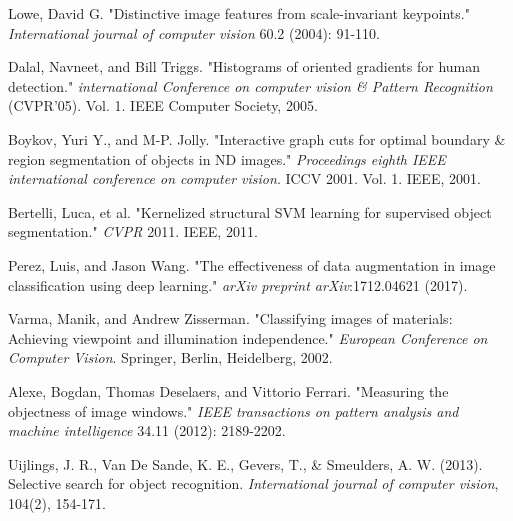 \documentclass[12pt]{report}
\begin{document}
\begin{thebibliography}{9}
			Lowe, David G. "Distinctive image features from scale-invariant keypoints." \textit{International journal of computer vision} 60.2 (2004): 91-110.
																																																																																																		
			Dalal, Navneet, and Bill Triggs. "Histograms of oriented gradients for human detection." \textit{international Conference on computer vision \& Pattern Recognition} (CVPR'05). Vol. 1. IEEE Computer Society, 2005.
																																																																																																
			Boykov, Yuri Y., and M-P. Jolly. "Interactive graph cuts for optimal boundary \& region segmentation of objects in ND images." \textit{Proceedings eighth IEEE international conference on computer vision}. ICCV 2001. Vol. 1. IEEE, 2001.
																																																																																															
			Bertelli, Luca, et al. "Kernelized structural SVM learning for supervised object segmentation." \textit{CVPR} 2011. IEEE, 2011.
																																																		
			Perez, Luis, and Jason Wang. "The effectiveness of data augmentation in image classification using deep learning." \textit{arXiv preprint arXiv}:1712.04621 (2017).
																																																																																										
			Varma, Manik, and Andrew Zisserman. "Classifying images of materials: Achieving viewpoint and illumination independence." \textit{European Conference on Computer Vision}. Springer, Berlin, Heidelberg, 2002.	
																																																																																													
			Alexe, Bogdan, Thomas Deselaers, and Vittorio Ferrari. "Measuring the objectness of image windows." \textit{IEEE transactions on pattern analysis and machine intelligence} 34.11 (2012): 2189-2202.
																																																																																										
			Uijlings, J. R., Van De Sande, K. E., Gevers, T., \& Smeulders, A. W. (2013). Selective search for object recognition. \textit{International journal of computer vision}, 104(2), 154-171.
																																																																																										

\end{thebibliography}
\end{document}
